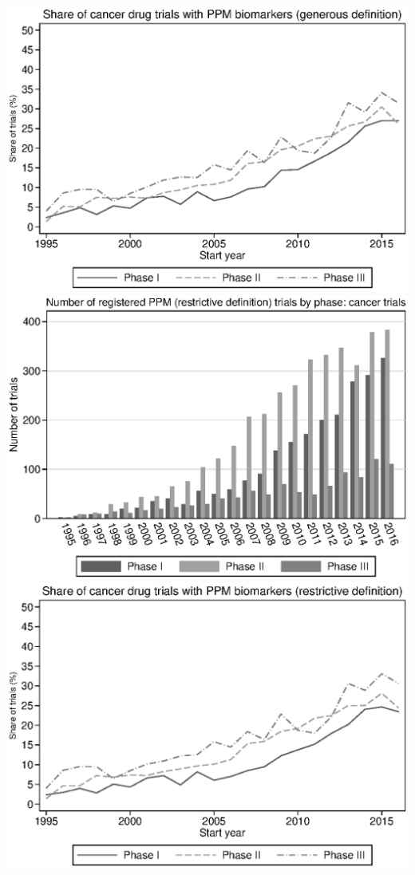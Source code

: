 \includegraphics{../figures/05b-g_ppm_share_by_phase_cancer.eps}
\includegraphics{../figures/05c-r_ppm_count_by_phase_cancer.eps}
\includegraphics{../figures/05d-r_ppm_share_by_phase_cancer.eps}
